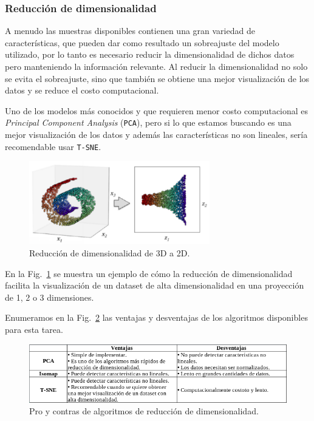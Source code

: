 \documentclass[a4paper,12pt]{article}
\begin{document}
\subsubsection{Reducción de dimensionalidad }

A menudo las muestras disponibles contienen una gran variedad de características, que pueden dar como resultado un sobreajuste del modelo utilizado, por lo tanto es necesario reducir la dimensionalidad de dichos datos pero manteniendo la información relevante. Al reducir la dimensionalidad no solo se evita el sobreajuste, sino que también se obtiene una mejor visualización de los datos y se reduce el costo computacional. 

\clearpage

Uno de los modelos más conocidos y que requieren menor costo computacional es \textit{Principal Component Analysis} (\texttt{PCA}), pero si lo que estamos buscando es una mejor visualización de los datos y además las características no son lineales, sería recomendable usar \texttt{T-SNE}. 

\begin{figure}[H]
	\begin{center}				
		\includegraphics[width=0.7\textwidth]{tesis_12.png}
		\caption{Reducción de dimensionalidad de 3D a 2D.}
		\label{fig:reduxdimension.}
	\end{center}
\end{figure}

En la Fig.~\ref{fig:reduxdimension.} \cite{trejoml} se muestra un ejemplo de cómo la reducción de dimensionalidad facilita la visualización de un dataset de alta dimensionalidad en una proyección de 1, 2 o 3 dimensiones.

Enumeramos en la Fig.~\ref{fig:proconsreduxdim.} las ventajas y desventajas de los algoritmos disponibles para esta tarea.

\begin{figure}[H]
	\begin{center}				
		\includegraphics[width=1\textwidth]{tesis_15.png}
		\caption{Pro y contras de algoritmos de reducción de dimensionalidad.}
		\label{fig:proconsreduxdim.}
	\end{center}
\end{figure}
\end{document}
